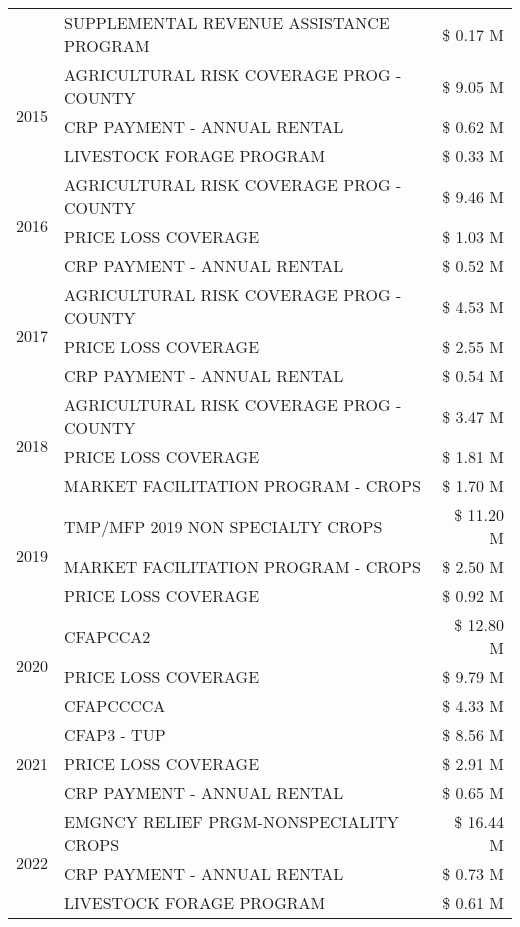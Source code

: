 \begin{tabular}{llr}
 & SUPPLEMENTAL REVENUE ASSISTANCE PROGRAM & \$ 0.17 M \\
\cline{1-3}
\multirow[t]{3}{*}{2015} & AGRICULTURAL RISK COVERAGE PROG - COUNTY & \$ 9.05 M \\
 & CRP PAYMENT - ANNUAL RENTAL & \$ 0.62 M \\
 & LIVESTOCK FORAGE PROGRAM & \$ 0.33 M \\
\cline{1-3}
\multirow[t]{3}{*}{2016} & AGRICULTURAL RISK COVERAGE PROG - COUNTY & \$ 9.46 M \\
 & PRICE LOSS COVERAGE & \$ 1.03 M \\
 & CRP PAYMENT - ANNUAL RENTAL & \$ 0.52 M \\
\cline{1-3}
\multirow[t]{3}{*}{2017} & AGRICULTURAL RISK COVERAGE PROG - COUNTY & \$ 4.53 M \\
 & PRICE LOSS COVERAGE & \$ 2.55 M \\
 & CRP PAYMENT - ANNUAL RENTAL & \$ 0.54 M \\
\cline{1-3}
\multirow[t]{3}{*}{2018} & AGRICULTURAL RISK COVERAGE PROG - COUNTY & \$ 3.47 M \\
 & PRICE LOSS COVERAGE & \$ 1.81 M \\
 & MARKET FACILITATION PROGRAM - CROPS & \$ 1.70 M \\
\cline{1-3}
\multirow[t]{3}{*}{2019} & TMP/MFP 2019 NON SPECIALTY CROPS & \$ 11.20 M \\
 & MARKET FACILITATION PROGRAM - CROPS & \$ 2.50 M \\
 & PRICE LOSS COVERAGE & \$ 0.92 M \\
\cline{1-3}
\multirow[t]{3}{*}{2020} & CFAPCCA2 & \$ 12.80 M \\
 & PRICE LOSS COVERAGE & \$ 9.79 M \\
 & CFAPCCCCA & \$ 4.33 M \\
\cline{1-3}
\multirow[t]{3}{*}{2021} & CFAP3 - TUP & \$ 8.56 M \\
 & PRICE LOSS COVERAGE & \$ 2.91 M \\
 & CRP PAYMENT - ANNUAL RENTAL & \$ 0.65 M \\
\cline{1-3}
\multirow[t]{3}{*}{2022} & EMGNCY RELIEF PRGM-NONSPECIALITY CROPS & \$ 16.44 M \\
 & CRP PAYMENT - ANNUAL RENTAL & \$ 0.73 M \\
 & LIVESTOCK FORAGE PROGRAM & \$ 0.61 M \\
\cline{1-3}
\bottomrule
\end{tabular}
